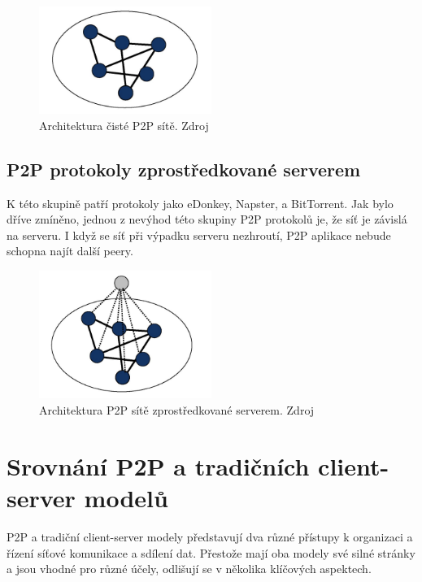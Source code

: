 \documentclass[10pt,twoside,czech,a4paper]{article}
\begin{document}
\begin{figure}[ht]
	\centering
	\includegraphics[width=0.5\textwidth]{pure-p2p.png}
	\caption{Architektura čisté P2P sítě. Zdroj \cite{Leong2007}}
	\label{fig:pure-p2p}
\end{figure}
	

\subsection{P2P protokoly zprostředkované serverem}

K této skupině patří protokoly jako eDonkey, Napster, a BitTorrent.
Jak bylo dříve zmíněno, jednou z nevýhod této skupiny P2P protokolů je, že síť je závislá na serveru.
I když se síť při výpadku serveru nezhroutí, P2P aplikace nebude schopna najít další peery\cite{Lui2002}.

\begin{figure}[ht]
	\centering
	\includegraphics[width=0.5\textwidth]{server-mediated-p2p.png}
	\caption{Architektura P2P sítě zprostředkované serverem. Zdroj \cite{Leong2007}}
	\label{fig:server-mediated-p2p}
\end{figure}


\section{Srovnání P2P a tradičních client-server modelů}

P2P a tradiční client-server modely představují dva různé přístupy k organizaci a řízení síťové komunikace a sdílení dat.
Přestože mají oba modely své silné stránky a jsou vhodné pro různé účely, odlišují se v několika klíčových aspektech.
\end{document}

